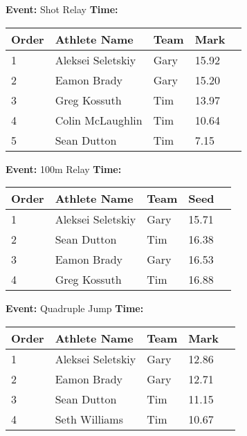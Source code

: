 \documentclass[10pt]{article}
\begin{document}
\textbf{Event:} Shot Relay \quad \textbf{Time:}  

\vspace{1em}
\begin{tabular}{@{}lllll@{}}
\toprule

\textbf{Order} & \textbf{Athlete Name} & \textbf{Team} & \textbf{Mark} \\
\midrule
1 & Aleksei Seletskiy & Gary & 15.92 &\\
2 & Eamon Brady & Gary & 15.20 &\\
3 & Greg Kossuth & Tim & 13.97 &\\
4 & Colin McLaughlin & Tim & 10.64 &\\
5 & Sean Dutton & Tim & 7.15 &\\
\bottomrule
\end{tabular}
\vspace{2.5em}


\textbf{Event:} 100m Relay \quad \textbf{Time:}  

\vspace{1em}
\begin{tabular}{@{}lllll@{}}
\toprule

\textbf{Order} & \textbf{Athlete Name} & \textbf{Team} & \textbf{Seed} \\
\midrule
1 & Aleksei Seletskiy & Gary & 15.71 &\\
2 & Sean Dutton & Tim & 16.38 &\\
3 & Eamon Brady & Gary & 16.53 &\\
4 & Greg Kossuth & Tim & 16.88 &\\
\bottomrule
\end{tabular}
\vspace{2.5em}


\textbf{Event:} Quadruple Jump \quad \textbf{Time:}  

\vspace{1em}
\begin{tabular}{@{}lllll@{}}
\toprule

\textbf{Order} & \textbf{Athlete Name} & \textbf{Team} & \textbf{Mark} \\
\midrule
1 & Aleksei Seletskiy & Gary & 12.86 &\\
2 & Eamon Brady & Gary & 12.71 &\\
3 & Sean Dutton & Tim & 11.15 &\\
4 & Seth Williams & Tim & 10.67 &\\
\bottomrule
\end{tabular}
\vspace{2.5em}
\end{document}

